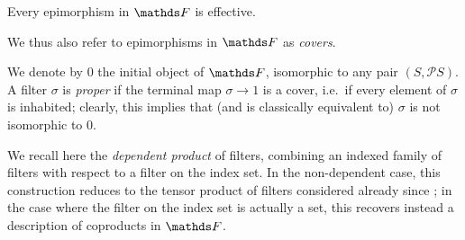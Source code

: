 \begin{lem}\label{lem:epis-are-regular}
    Every epimorphism in $\FF$ is effective. 
\end{lem}

\begin{rmk}
    We thus also refer to epimorphisms in $\FF$ as \emph{covers}.
\end{rmk}

We denote by $0$ the initial object of $\FF$, isomorphic to any pair $(S, \mathcal P S)$. A filter $\sigma$ is \emph{proper} if the terminal map $\sigma \to 1$ is a cover, i.e.\ if every element of $\sigma$ is inhabited; clearly, this implies that (and is classically equivalent to) $\sigma$ is not isomorphic to $0$.

We recall here the \emph{dependent product} of filters, combining an indexed family of filters with respect to a filter on the index set. In the non-dependent case, this construction reduces to the tensor product of filters considered already since \cite{blassTwoClosedCategories1977}; in the case where the filter on the index set is actually a set, this recovers instead a description of coproducts in $\FF$. 

